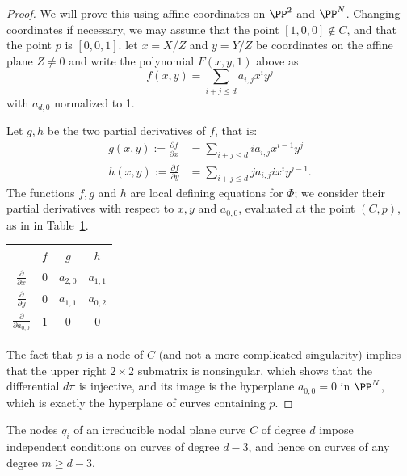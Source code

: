 \begin{proof}
We will prove this using affine coordinates on $\PP^2$ and $\PP^N$. Changing coordinates if necessary, we may assume that the point $[1,0,0] \notin C$, and that the point $p$ is $[0,0,1]$. let $x = X/Z$ and $y = Y/Z$ be coordinates on the affine plane $Z \neq 0$ and write the polynomial $F(x,y,1)$ above as
$$
f(x,y) = \sum_{i+j \leq d} a_{i,j} x^iy^j 
$$
with $a_{d,0}$ normalized to 1. 

Let $g,h$ be the two partial derivatives of $f$, that is:
\begin{align*}
 g(x,y) := \frac{\partial f}{\partial x} &= \sum_{i+j \leq d} i a_{i,j} x^{i-1}y^j\\
h(x,y) := \frac{\partial f}{\partial y} &= \sum_{i+j \leq d} j a_{i,j} ix^{i}y^{j-1}.
\end{align*}
The functions $f, g$ and $h$ are local defining equations for $\Phi$; we consider their partial derivatives with respect to $x, y$ and $a_{0,0}$, evaluated at the point $(C,p)$, as in in Table~\ref{tang to Delta}.

\begin{table}[h!]\label{tang to Delta}
  \begin{center}
     \begin{tabular}{c|c|c|c} %
            & $f$ & $g$ & $h$ \\
      \hline
$\frac{\partial}{\partial x}$ & 0 & $a_{2,0}$ & $a_{1,1}$ \\
$\frac{\partial}{\partial y}$ & 0 & $a_{1,1}$ & $a_{0,2}$ \\
$\frac{\partial}{\partial a_{0,0}}$ & 1 & 0 & 0 
    \end{tabular}
  \end{center}
\end{table}

The fact that $p$ is a node of $C$ (and not a more complicated singularity) implies that the upper right $2 \times 2$ submatrix is nonsingular, which shows that the differential $d\pi$ is injective, and its image is the hyperplane $a_{0,0} = 0$ in $\PP^N$, which is exactly the hyperplane of curves containing $p$.
\end{proof}

\begin{lemma}\label{adjoint independent}
The nodes $q_i$ of an irreducible nodal plane curve $C$ of degree $d$ impose independent conditions on curves of degree $d-3$, and hence on curves of any degree $m \geq d-3$.
\end{lemma}


